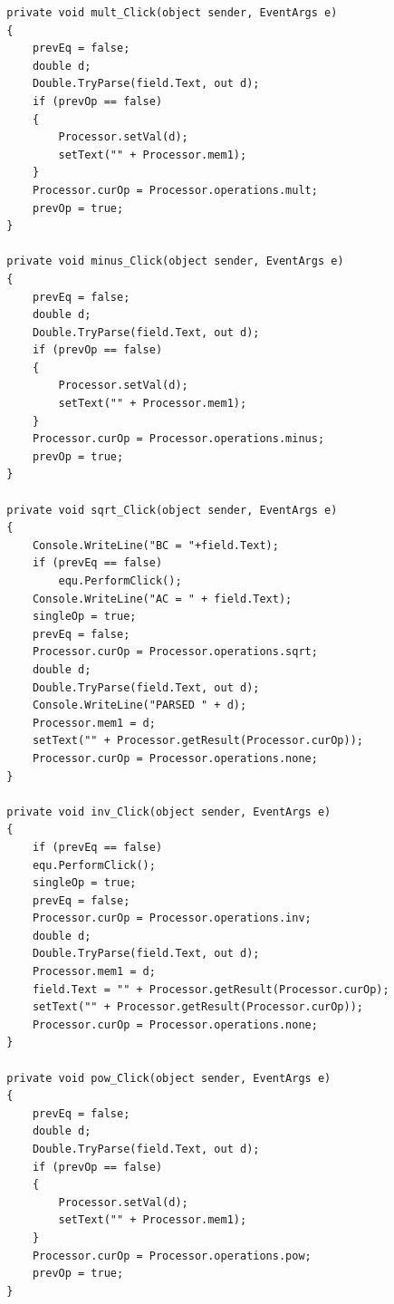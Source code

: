 \documentclass[12pt]{article}
\begin{document}
\begin{lstlisting}
        private void mult_Click(object sender, EventArgs e)
        {
            prevEq = false;
            double d;
            Double.TryParse(field.Text, out d);
            if (prevOp == false)
            {
                Processor.setVal(d);
                setText("" + Processor.mem1);
            }
            Processor.curOp = Processor.operations.mult;
            prevOp = true;
        }

        private void minus_Click(object sender, EventArgs e)
        {
            prevEq = false;
            double d;
            Double.TryParse(field.Text, out d);
            if (prevOp == false)
            {
                Processor.setVal(d);
                setText("" + Processor.mem1);
            }
            Processor.curOp = Processor.operations.minus;
            prevOp = true;
        }

        private void sqrt_Click(object sender, EventArgs e)
        {
            Console.WriteLine("BC = "+field.Text);
            if (prevEq == false)
                equ.PerformClick();
            Console.WriteLine("AC = " + field.Text);
            singleOp = true;
            prevEq = false;
            Processor.curOp = Processor.operations.sqrt;
            double d;
            Double.TryParse(field.Text, out d);
            Console.WriteLine("PARSED " + d);
            Processor.mem1 = d;
            setText("" + Processor.getResult(Processor.curOp));
            Processor.curOp = Processor.operations.none;
        }

        private void inv_Click(object sender, EventArgs e)
        {
            if (prevEq == false)
            equ.PerformClick();
            singleOp = true;
            prevEq = false;
            Processor.curOp = Processor.operations.inv;
            double d;
            Double.TryParse(field.Text, out d);
            Processor.mem1 = d;
            field.Text = "" + Processor.getResult(Processor.curOp);
            setText("" + Processor.getResult(Processor.curOp));
            Processor.curOp = Processor.operations.none;
        }

        private void pow_Click(object sender, EventArgs e)
        {
            prevEq = false;
            double d;
            Double.TryParse(field.Text, out d);
            if (prevOp == false)
            {
                Processor.setVal(d);
                setText("" + Processor.mem1);
            }
            Processor.curOp = Processor.operations.pow;
            prevOp = true;
        }


\end{lstlisting}
\end{document}
